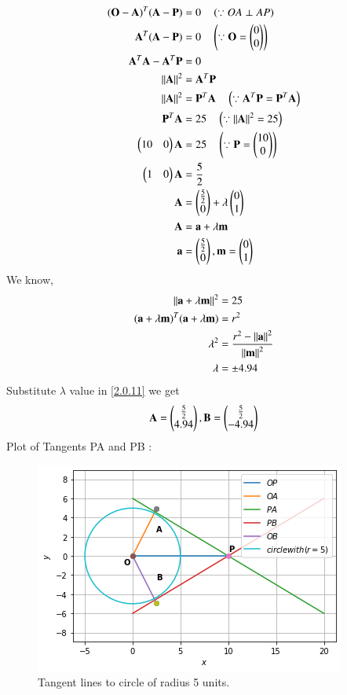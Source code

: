 \documentclass[journal,12pt,twocolumn]{IEEEtran}
\begin{document}
\begin{align}
(\mathbf{O}-\mathbf{A})^T (\mathbf{A}-\mathbf{P}) &= 0 \quad \left(\because OA \perp AP \right)
\\
\mathbf{A}^T(\mathbf{A}-\mathbf{P}) &= 0 \quad \left(\because \mathbf{O}=\begin{pmatrix}0\\0\end{pmatrix}\right)
\\
\mathbf{A}^T \mathbf{A} - \mathbf{A}^T \mathbf{P} &= 0  
\\
\left\lVert\mathbf{A}\right\rVert^2 &= \mathbf{A}^T \mathbf{P}
\\
\left\lVert\mathbf{A}\right\rVert^2 &= \mathbf{P}^T \mathbf{A}  \quad \left(\because \mathbf{A}^T \mathbf{P} = \mathbf{P}^T \mathbf{A}\right)
\\
\mathbf{P}^T \mathbf{A} &= 25 \quad \left(\because \left\lVert\mathbf{A}\right\rVert^2 = 25\right)
\\
\begin{pmatrix}10&0\end{pmatrix} \mathbf{A} &= 25 \quad \left(\because \mathbf{P} = \begin{pmatrix}10\\0\end{pmatrix} \right)
\\
\begin{pmatrix}1&0\end{pmatrix} \mathbf{A} &= \frac{5}{2}
\\
\mathbf{A} &= \begin{pmatrix}\frac{5}{2}\\0\end{pmatrix} + \lambda \begin{pmatrix}0\\1\end{pmatrix} \label{2.0.11} 
\\
\mathbf{A}&=\mathbf{a}+\lambda\mathbf{m} 
\\
\mathbf{a}&=\begin{pmatrix}\frac{5}{2}\\ 0\end{pmatrix},\mathbf{m}=\begin{pmatrix}0\\1\end{pmatrix}
\end{align}
We know,
\begin{align}
\left\lVert\mathbf{a}+\lambda\mathbf{m}\right\rVert^2&=25
\\
(\mathbf{a}+\lambda \mathbf{m})^T(\mathbf{a}+\lambda \mathbf{m})&=r^2
\\
\lambda^2&=\frac{r^2-\left\lVert\mathbf{a}\right\rVert^2}{\left\lVert\mathbf{m}\right\rVert^2}
\\
\lambda &= \pm 4.94
\end{align}
Substitute $\lambda$  value in \eqref{2.0.11} we get
\begin{align}
\mathbf{A}=\begin{pmatrix}\frac{5}{2}\\4.94\end{pmatrix},
\mathbf{B}=\begin{pmatrix}\frac{5}{2}\\-4.94\end{pmatrix}
\end{align}
Plot of Tangents PA and PB :
\begin{figure}[ht]
    \centering
    \includegraphics[width=\columnwidth]{TANGENT.png}
    \caption{Tangent lines to circle of radius 5 units.}
    \label{fig:Tangent lines to circle of radius 5 units.}
\end{figure}    
\end{document}
